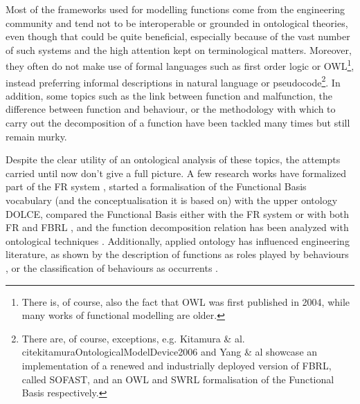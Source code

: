 \documentclass[sw]{iosart2x}
\newcommand{\DOLCE}{\textsc{DOLCE}\xspace} %
\newcommand{\OWL}{\textnormal{OWL}\xspace}
\begin{document}
Most of the frameworks used for modelling functions come from the engineering community and tend not to be interoperable or grounded in ontological theories, even though that could be quite beneficial, especially because of the vast number of such systems and the high attention kept on terminological matters. 
Moreover, they often do not make use of formal languages such as first order logic or \OWL\footnote{There is, of course, also the fact that \OWL was first published in 2004, while many works of functional modelling are older.}, instead preferring informal descriptions in natural language or pseudocode\footnote{There are, of course, exceptions, e.g. Kitamura \& al. cite{kitamuraOntologicalModelDevice2006} and Yang \& al \cite{yangFunctionSemanticRepresentation2010} %
showcase an implementation of a renewed and industrially deployed version of FBRL, called SOFAST, %
and an \OWL and SWRL formalisation of the Functional Basis %
respectively.}.
In addition, some topics such as the link between function and malfunction, the difference between function and behaviour, or the methodology with which to carry out the decomposition of a function have been tackled many times but still remain murky.

Despite the clear utility of an ontological analysis of these topics, the attempts carried until now don't give a full picture. 
A few research works have formalized part of the FR system \cite{borgoFormalOntologicalPerspective2009}, started a formalisation of the Functional Basis vocabulary (and the conceptualisation it is based on) with the upper ontology \DOLCE \cite{borgoOntologicalRepresentationFunctional2009, borgoFormalizationFunctionsOperations2011}, compared the Functional Basis either with the FR system \cite{garbaczTwoOntologydrivenFormalisations2011} or with both FR and FBRL \cite{kitamuraDeepSemanticMapping2008}, and the function decomposition relation has been analyzed with ontological techniques \cite{vermaasFunctionalDecompositionMereology2009a,vermaasFormalImpossibilityAnalysing2013}. 
Additionally, applied ontology has influenced engineering literature, as shown by the description of functions as roles played by behaviours \cite{mizoguchiUnifiedDefinitionFunction2012, kitamuraOntologicalModelDevice2006, chandrasekaranFunctionDeviceRepresentation2000}, or the classification of behaviours as occurrents \cite{kitamuraOntologicalModelDevice2006}.
\end{document}
